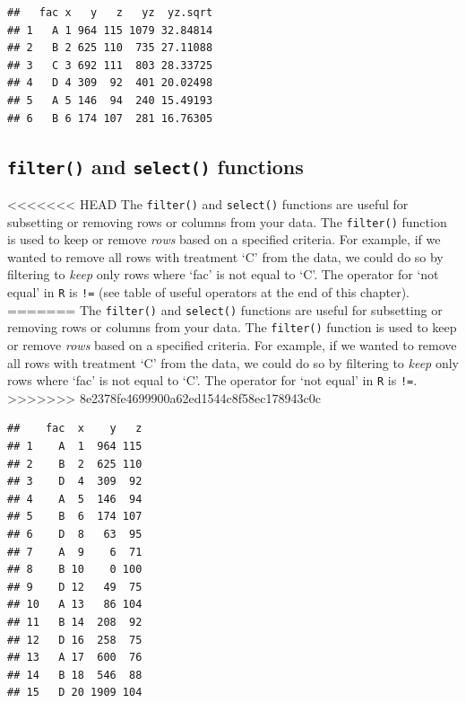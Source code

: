 \documentclass[letterpaper,]{book}
\newenvironment{Shaded}{\begin{snugshade}}{\end{snugshade}}
\newcommand{\KeywordTok}[1]{\textcolor[rgb]{0.13,0.29,0.53}{\textbf{#1}}}
\newcommand{\NormalTok}[1]{#1}
\newcommand{\OperatorTok}[1]{\textcolor[rgb]{0.81,0.36,0.00}{\textbf{#1}}}
\newcommand{\StringTok}[1]{\textcolor[rgb]{0.31,0.60,0.02}{#1}}
\begin{document}
\begin{verbatim}
##   fac x   y   z   yz  yz.sqrt
## 1   A 1 964 115 1079 32.84814
## 2   B 2 625 110  735 27.11088
## 3   C 3 692 111  803 28.33725
## 4   D 4 309  92  401 20.02498
## 5   A 5 146  94  240 15.49193
## 6   B 6 174 107  281 16.76305
\end{verbatim}

\hypertarget{filter-and-select-functions}{%
\subsection{\texorpdfstring{\texttt{filter()} and \texttt{select()} functions}{filter() and select() functions}}\label{filter-and-select-functions}}

\textless{}\textless{}\textless{}\textless{}\textless{}\textless{}\textless{} HEAD
The \texttt{filter()} and \texttt{select()} functions are useful for subsetting or removing rows or columns from your data. The \texttt{filter()} function is used to keep or remove \emph{rows} based on a specified criteria. For example, if we wanted to remove all rows with treatment `C' from the data, we could do so by filtering to \emph{keep} only rows where `fac' is not equal to `C'. The operator for `not equal' in \texttt{R} is \texttt{!=} (see table of useful operators at the end of this chapter).
=======
The \texttt{filter()} and \texttt{select()} functions are useful for subsetting or removing rows or columns from your data. The \texttt{filter()} function is used to keep or remove \emph{rows} based on a specified criteria. For example, if we wanted to remove all rows with treatment `C' from the data, we could do so by filtering to \emph{keep} only rows where `fac' is not equal to `C'. The operator for `not equal' in \texttt{R} is \texttt{!=}.
\textgreater{}\textgreater{}\textgreater{}\textgreater{}\textgreater{}\textgreater{}\textgreater{} 8e2378fe4699900a62ed1544c8f58ec178943c0c

\begin{Shaded}
\end{Shaded}

\begin{verbatim}
##    fac  x    y   z
## 1    A  1  964 115
## 2    B  2  625 110
## 3    D  4  309  92
## 4    A  5  146  94
## 5    B  6  174 107
## 6    D  8   63  95
## 7    A  9    6  71
## 8    B 10    0 100
## 9    D 12   49  75
## 10   A 13   86 104
## 11   B 14  208  92
## 12   D 16  258  75
## 13   A 17  600  76
## 14   B 18  546  88
## 15   D 20 1909 104
\end{verbatim}
\end{document}

